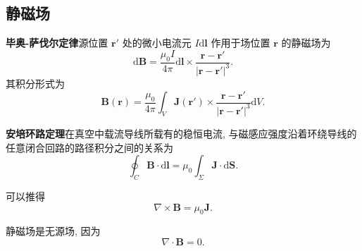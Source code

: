 \subsection{静磁场}
\textbf{毕奥-萨伐尔定律}\quad 源位置 $\bm{r}'$ 处的微小电流元 $I\mathrm{d}\bm{l}$ 作用于场位置 $\bm{r}$ 的静磁场为
\begin{equation}
    \mathrm{d}\bm{B}=\frac{\mu_0 I}{4\pi}\mathrm{d}\bm{l}\times\frac{\bm{r}-\bm{r}'}{|\bm{r}-\bm{r}'|^3}.
\end{equation}
其积分形式为
\begin{equation}
    \bm{B}(\bm{r})=\frac{\mu_0}{4\pi}\int_V\bm{J}(\bm{r}')\times\frac{\bm{r}-\bm{r}'}{|\bm{r}-\bm{r}'|^3}\mathrm{d}V.
\end{equation}

\textbf{安培环路定理}\quad 在真空中载流导线所载有的稳恒电流, 与磁感应强度沿着环绕导线的任意闭合回路的路径积分之间的关系为
\begin{equation}
    \oint_C\bm{B}\cdot\mathrm{d}\bm{l}=\mu_0\int_\Sigma\bm{J}\cdot\mathrm{d}\bm{S}.
\end{equation}

可以推得
\begin{equation}
    \nabla\times\bm{B}=\mu_0\bm{J}.
\end{equation}

静磁场是无源场, 因为
\begin{equation}
    \nabla\cdot\bm{B}=0.
\end{equation}
